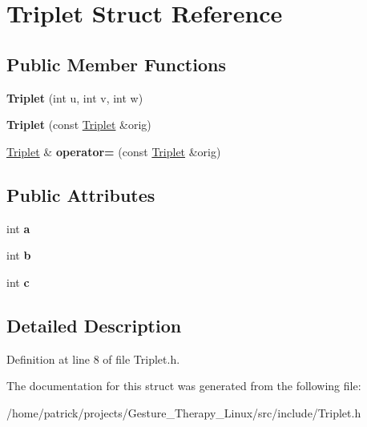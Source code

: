 \hypertarget{struct_triplet}{}\section{Triplet Struct Reference}
\label{struct_triplet}
\subsection*{Public Member Functions}
\begin{DoxyCompactItemize}
\item 
\mbox{\label{struct_triplet_a70457ef6a05b29f73ebcd8f9270797e3}} 
{\bfseries Triplet} (int u, int v, int w)
\item 
\mbox{\label{struct_triplet_aa6d4bab5cc79da13ed8ac1797b116838}} 
{\bfseries Triplet} (const \hyperlink{struct_triplet}{Triplet} \&orig)
\item 
\mbox{\label{struct_triplet_a39e9b4fa3119643737509863defa67ce}} 
\hyperlink{struct_triplet}{Triplet} \& {\bfseries operator=} (const \hyperlink{struct_triplet}{Triplet} \&orig)
\end{DoxyCompactItemize}
\subsection*{Public Attributes}
\begin{DoxyCompactItemize}
\item 
\mbox{\label{struct_triplet_a8f29696c8699a74d729762bd4ac021e0}} 
int {\bfseries a}
\item 
\mbox{\label{struct_triplet_ab04c763889df0502639bc2020f445057}} 
int {\bfseries b}
\item 
\mbox{\label{struct_triplet_a55aeb5803c35b59e170160588c090dbb}} 
int {\bfseries c}
\end{DoxyCompactItemize}


\subsection{Detailed Description}


Definition at line 8 of file Triplet.\+h.



The documentation for this struct was generated from the following file\+:\begin{DoxyCompactItemize}
\item 
/home/patrick/projects/\+Gesture\+\_\+\+Therapy\+\_\+\+Linux/src/include/Triplet.\+h\end{DoxyCompactItemize}
